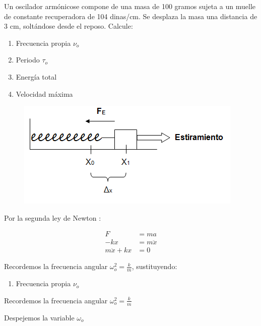 
Un oscilador armónicose compone de una masa de 100 gramos sujeta a un muelle de constante
recuperadora de 104 dinas/cm. Se desplaza la masa una distancia de 3 cm, soltándose desde 
el reposo. Calcule:

\begin{enumerate}
    \item Frecuencia propia  $ \nu_{o}  $
    \item Periodo  $ \tau_{o}  $
    \item Energía total
    \item Velocidad máxima
\end{enumerate}

\vspace*{0.3 cm}

\begin{figure}[h]
    \centering
    \includegraphics[scale=0.75]{masa_resorte.png}
\end{figure}

Por la segunda ley de Newton :

\begin{align*}
    F&=ma \\
    -kx&=m \ddot{x} \\
    m \ddot{x}+kx&=0
\end{align*}

Recordemos la frecuencia angular $\omega_{o}^{2}=\frac{k}{m}$, sustituyendo:

\begin{enumerate}
    \item Frecuencia propia  $ \nu_{o}  $
\end{enumerate}

\vspace*{0.35cm}

Recordemos la frecuencia angular $\omega_{o}^{2}=\frac{k}{m}$

\vspace*{0.35cm}

Despejemos la variable $\omega_{o}$

